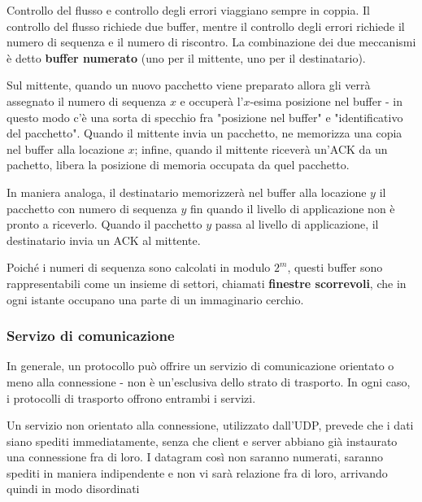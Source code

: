             \vspace{3mm}
            
            Controllo del flusso e controllo degli errori viaggiano sempre in coppia. Il controllo del flusso richiede due buffer, mentre il controllo degli errori richiede il numero di sequenza e il numero di riscontro. La combinazione dei due meccanismi è detto \textbf{buffer numerato} (uno per il mittente, uno per il destinatario).
            
            \vspace{3mm}
            
            Sul mittente, quando un nuovo pacchetto viene preparato allora gli verrà assegnato il numero di sequenza $x$ e occuperà l'$x$-esima posizione nel buffer - in questo modo c'è una sorta di specchio fra "posizione nel buffer" e "identificativo del pacchetto". Quando il mittente invia un pacchetto, ne memorizza una copia nel buffer alla locazione $x$; infine, quando il mittente riceverà un'ACK da un pachetto, libera la posizione di memoria occupata da quel pacchetto.
            
            In maniera analoga, il destinatario memorizzerà nel buffer alla locazione $y$ il pacchetto con numero di sequenza $y$ fin quando il livello di applicazione non è pronto a riceverlo. Quando il pacchetto $y$ passa al livello di applicazione, il destinatario invia un ACK al mittente.
            
            \vspace{3mm}
            
            Poiché i numeri di sequenza sono calcolati in modulo $2^m$, questi buffer sono rappresentabili come un insieme di settori, chiamati \textbf{finestre scorrevoli}, che in ogni istante occupano una parte di un immaginario cerchio.
            
        \subsubsection{Servizo di comunicazione}
        
            In generale, un protocollo può offrire un servizio di comunicazione orientato o meno alla connessione - non è un'esclusiva dello strato di trasporto. In ogni caso, i protocolli di trasporto offrono entrambi i servizi.
            
            \vspace{3mm}
            
            Un servizio non orientato alla connessione, utilizzato dall'UDP, prevede che i dati siano spediti immediatamente, senza che client e server abbiano già instaurato una connessione fra di loro. I datagram così non saranno numerati, saranno spediti in maniera indipendente e non vi sarà relazione fra di loro, arrivando quindi in modo disordinati
            
